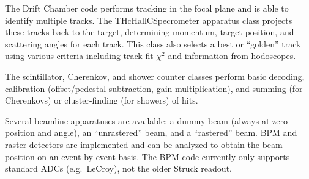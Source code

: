 {{The Drift Chamber code performs tracking in the focal plane and is able to
identify multiple tracks.  The THcHallCSpecrometer apparatus class
projects these tracks back to the target, determining momentum, target
position, and scattering angles for each track.  This class also
selects a best or ``golden'' track using various criteria including
track fit $\chi^2$ and information from hodoscopes.

The scintillator, Cherenkov, and shower counter classes perform basic decoding,
calibration (offset/pedestal subtraction, gain multiplication), and summing
(for Cherenkovs) or cluster-finding (for showers) of hits.

Several beamline apparatuses are available: a dummy beam (always at zero
position and angle), an ``unrastered'' beam, and a ``rastered'' beam.
BPM and raster detectors are implemented and
can be analyzed to obtain the beam position
on an event-by-event basis.  The BPM code currently only supports
standard ADCs (e.g.\ LeCroy), not the older Struck readout.


}}
